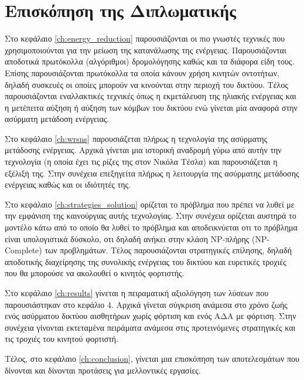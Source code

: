 \section{Επισκόπηση της Διπλωματικής}
Στο κεφάλαιο \ref{ch:energy_reduction} παρουσιάζονται οι πιο γνωστές τεχνικές που χρησιμοποιούνται για την μείωση της κατανάλωσης της ενέργειας. Παρουσιάζονται
αποδοτικά πρωτόκολλα (αλγόριθμοι) δρομολόγησης καθώς και τα διάφορα είδη τους. Επίσης παρουσιάζονται πρωτόκολλα τα οποία κάνουν χρήση κινητών οντοτήτων, δηλαδή
συσκευές οι οποίες μπορούν να κινούνται στην περιοχή του δικτύου. Τέλος παρουσιάζονται εναλλακτικές τεχνικές όπως η εκμετάλευση της ηλιακής ενέργειας και η μετέπειτα
αύξηση ή αύξηση των κόμβων του δικτύου ενώ γίνεται μία αναφορά στην ασύρματη μετάδοση ενέργειας.

Στο κεφάλαιο \ref{ch:wrsns} παρουσιάζεται πλήρως η τεχνολογία της ασύρματης μετάδοσης ενέργειας. Αρχικά γίνεται μια ιστορική αναδρομή γύρω από αυτήν την τεχνολογία (η
οποία έχει τις ρίζες της στον Νικόλα Τέσλα) και παρουσιάζεται η εξέλιξή της. Στην συνέχεια επεξηγείτα πλήρως η λειτουργία της ασύρματης μετάδοσης ενέργειας καθώς και
οι ιδιότητές της.

Στο κεφάλαιο \ref{ch:strategies_solution} ορίζεται το πρόβλημα που πρέπει να λυθεί με την εμφάνιση της καινούργιας αυτής τεχνολογίας. Στην συνέχεια ορίζεται αυστηρά
το μοντέλο κάτω από το οποίο θα λυθεί το πρόβλημα και αποδεικνύεται οτι το πρόβλημα είναι υπολογιστικά δύσκολο, οτι δηλαδή ανήκει στην κλάση NP-πλήρης (NP-Complete)
των προβλημάτων. Τέλος παρουσιάζονται στρατηγικές επίλησης, δηλαδή αποδοτικής διαχείρησης της συνολικής ενέργειας του δικτύου και ευρετικές τροχιές που θα μπορούσε να
ακολουθεί ο κινητός φορτιστής.

Στο κεφάλαιο \ref{ch:results} γίνεται η πειραματική αξιολόγηση των λύσεων που παρουσιάστηκαν στο κεφάλιο 4. Αρχικά γίνεται σύγκριση ανάμεσα στο χρόνο ζωής ενός
ασύρματου δικτύου αισθητήρων χωρίς φόρτιση και ενός ΑΔΑ με φόρτιση. Στην συνέχεια γίνονται εκτεταμένα πειράματα ανάμεσα στις προτεινόμενες στρατηγικές και τις τροχιές
του κινητού φορτιστή.

Τέλος, στο κεφάλαιο \ref{ch:conclusion}, γίνεται μια επισκόπηση των αποτελεσμάτων που δίνονται και δίνονται προτάσεις για μελλοντικές εργασίες.


\label{ch:wsns}